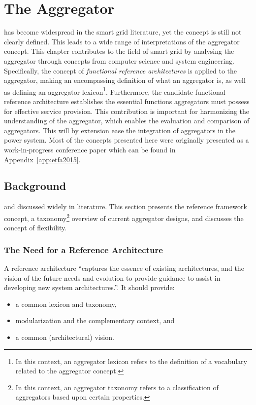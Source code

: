 \chapter{The Aggregator} %
\label{cha:aggregator}%
 has become widespread in the smart grid literature, yet the concept is still not clearly defined. This leads to a wide range of interpretations of the aggregator concept. This chapter contributes to the field of smart grid by analysing the aggregator through concepts from computer science and system engineering. Specifically, the concept of \emph{functional reference architectures} is applied to the aggregator, making an encompassing definition of what an aggregator is, as well as defining an aggregator lexicon\footnote{In this context, an aggregator lexicon refers to the definition of a vocabulary related to the aggregator concept.}. Furthermore, the candidate functional reference architecture establishes the essential functions aggregators must possess for effective service provision. This contribution is important for harmonizing the understanding of the aggregator, which enables the evaluation and comparison of aggregators. This will by extension ease the integration of aggregators in the power system. Most of the concepts presented here were originally presented as a work-in-progress conference paper which can be found in Appendix~\ref{app:etfa2015}. 

\section{Background}
 and discussed widely in literature. This section presents the reference framework concept, a taxonomy\footnote{In this context, an aggregator taxonomy refers to a classification of aggregators based upon certain properties.} overview of current aggregator designs, and discusses the concept of flexibility. 
\subsection{The Need for a Reference Architecture} %
\label{sub:ReferenceArchitecture}
A reference architecture ``captures the essence of existing architectures, and the vision of the future needs and evolution to provide guidance to assist in developing new system architectures.''. It should provide: 
\begin{itemize}
\item a common lexicon and taxonomy,
\item modularization and the complementary context, and
\item a common (architectural) vision.
\end{itemize} 

